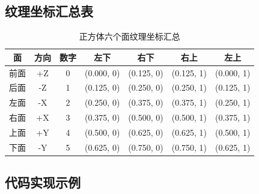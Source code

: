 \documentclass[12pt,a4paper]{article}
\begin{document}
\subsection{纹理坐标汇总表}

\begin{table}[H]
\centering
\caption{正方体六个面纹理坐标汇总}
\begin{tabular}{|c|c|c|c|c|c|c|}
\hline
\textbf{面} & \textbf{方向} & \textbf{数字} & \textbf{左下} & \textbf{右下} & \textbf{右上} & \textbf{左上} \\
\hline
前面 & +Z & 0 & (0.000, 0) & (0.125, 0) & (0.125, 1) & (0.000, 1) \\
\hline
后面 & -Z & 1 & (0.125, 0) & (0.250, 0) & (0.250, 1) & (0.125, 1) \\
\hline
左面 & -X & 2 & (0.250, 0) & (0.375, 0) & (0.375, 1) & (0.250, 1) \\
\hline
右面 & +X & 3 & (0.375, 0) & (0.500, 0) & (0.500, 1) & (0.375, 1) \\
\hline
上面 & +Y & 4 & (0.500, 0) & (0.625, 0) & (0.625, 1) & (0.500, 1) \\
\hline
下面 & -Y & 5 & (0.625, 0) & (0.750, 0) & (0.750, 1) & (0.625, 1) \\
\hline
\end{tabular}
\end{table}

\subsection{代码实现示例}
\end{document}
